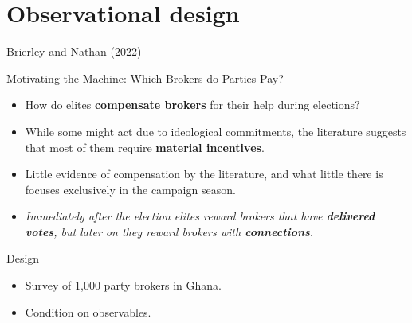 \documentclass[10pt,table,aspectratio=169]{beamer}
\begin{document}
\section{Observational design}

\begin{frame}[plain, label = two_dimensions]{Brierley and Nathan (2022)}

Motivating the Machine: Which Brokers do Parties Pay?\pause

\begin{itemize}
  \item How do elites \alert{\bf compensate brokers} for their help during elections?\pause
  \item While some might act due to ideological commitments, the literature suggests that most of them require \alert{\bf material incentives}.\pause
  \item Little evidence of compensation by the literature, and what little there is focuses exclusively in the campaign season.\pause
  \item \textit{Immediately after the election elites reward brokers that have \alert{\bf delivered votes}, but later on they reward brokers with \alert{\bf connections}.}\pause
\end{itemize}

Design

\begin{itemize}
  \item Survey of 1,000 party brokers in Ghana.\pause
  \item Condition on observables.
\end{itemize}

\end{frame}
\end{document}
